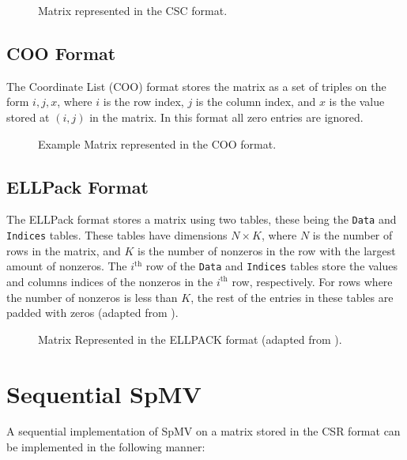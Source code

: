 \begin{figure}[H]
    \centering
    \caption{Matrix represented in the CSC format.}
    \label{fig:cscformat}
\end{figure}

\subsection{COO Format}
The Coordinate List (COO) format stores the matrix as a set of triples on the form \(i,j,x\), where \(i\) is the row index, \(j\) is the column index, and \(x\) is the value stored at \((i,j)\) in the matrix. In this format all zero entries are ignored.

\begin{figure}[H]
    \centering
    \caption{Example Matrix represented in the COO format.}
    \label{fig:cooformat}
\end{figure}

\subsection{ELLPack Format}
The ELLPack format stores a matrix using two tables, these being the \texttt{Data} and \texttt{Indices} tables. These tables have dimensions \(N \times K\), where \(N\) is the number of rows in the matrix, and \(K\) is the number of nonzeros in the row with the largest amount of nonzeros. The \(i^{\text{th}}\) row of the \texttt{Data} and \texttt{Indices} tables store the values and columns indices of the nonzeros in the \(i^{\text{th}}\) row, respectively. For rows where the number of nonzeros is less than \(K\), the rest of the entries in these tables are padded with zeros (adapted from \cite{ellpackformat}).

\begin{figure}[H]
    \centering
    \caption{Matrix Represented in the ELLPACK format (adapted from \cite{ellpackformat}).}
    \label{fig:ellpackformat}
\end{figure}


\section{Sequential SpMV}
A sequential implementation of SpMV on a matrix stored in the CSR format can be implemented in the following manner:
\medskip

\begin{algorithm}[htbp]
    \caption{Sequential CSR-based SpMV}
    \SetAlgoVlined

\end{algorithm}
\label{alg:sequentialspmv}
\medskip

